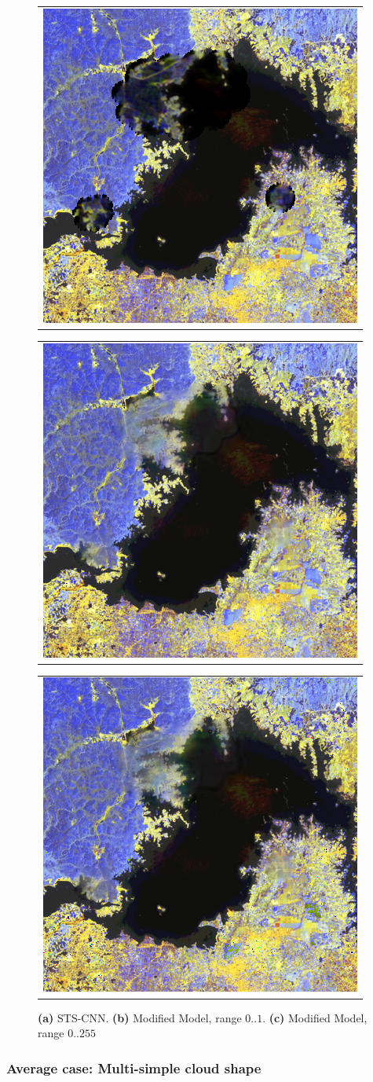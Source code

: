 \begin{figure}[h!]
    \begin{center}
        \begin{tabular}[b]{c}
            \includegraphics[width=0.3\linewidth]{figures/sts_sample_cloud.png}
          \end{tabular}
          \begin{tabular}[b]{c}
            \includegraphics[width=0.3\linewidth]{figures/1_simple.png}
          \end{tabular}
          \begin{tabular}[b]{c}
              \includegraphics[width=0.3\linewidth]{figures/255_simple.png}
          \end{tabular} 
    \end{center}
	\caption{
		\textbf{(a)} STS-CNN.
		\textbf{(b)} Modified Model, range $0..1$.
		\textbf{(c)} Modified Model, range $0..255$}
	\label{fig:improvedModel_experiment_1}
\end{figure}


\subsubsection{Average case: Multi-simple cloud shape}

